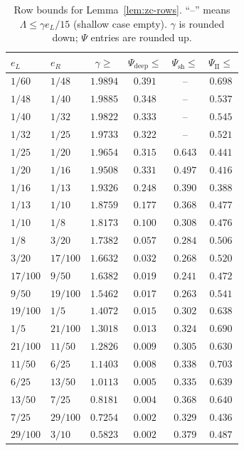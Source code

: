 \documentclass[11pt]{article}
\theoremstyle{remark}
\theoremstyle{plain}
\theoremstyle{plain}
\begin{document}
\begin{table}[h]
\centering\small
\caption{Row bounds for Lemma~\ref{lem:zc-rows}.  ``--'' means
$\Lambda\le\gamma e_L/15$ (shallow case empty).  $\gamma$ is rounded down;
$\Psi$ entries are rounded up.}\label{tab:rows}
\begin{tabular}{llcccc}
\toprule
$e_L$ & $e_R$ & $\gamma\ge$ & $\Psi_{\mathrm{deep}}\le$ &
$\Psi_{\mathrm{sh}}\le$ & $\Psi_{\mathrm{II}}\le$\\
\midrule
$1/60$ & $1/48$ & $1.9894$ & $0.391$ & -- & $0.698$\\
$1/48$ & $1/40$ & $1.9885$ & $0.348$ & -- & $0.537$\\
$1/40$ & $1/32$ & $1.9822$ & $0.333$ & -- & $0.545$\\
$1/32$ & $1/25$ & $1.9733$ & $0.322$ & -- & $0.521$\\
$1/25$ & $1/20$ & $1.9654$ & $0.315$ & $0.643$ & $0.441$\\
$1/20$ & $1/16$ & $1.9508$ & $0.331$ & $0.497$ & $0.416$\\
$1/16$ & $1/13$ & $1.9326$ & $0.248$ & $0.390$ & $0.388$\\
$1/13$ & $1/10$ & $1.8759$ & $0.177$ & $0.368$ & $0.477$\\
$1/10$ & $1/8$  & $1.8173$ & $0.100$ & $0.308$ & $0.476$\\
$1/8$  & $3/20$ & $1.7382$ & $0.057$ & $0.284$ & $0.506$\\
$3/20$ & $17/100$ & $1.6632$ & $0.032$ & $0.268$ & $0.520$\\
$17/100$ & $9/50$ & $1.6382$ & $0.019$ & $0.241$ & $0.472$\\
$9/50$ & $19/100$ & $1.5462$ & $0.017$ & $0.263$ & $0.541$\\
$19/100$ & $1/5$ & $1.4072$ & $0.015$ & $0.302$ & $0.638$\\
$1/5$ & $21/100$ & $1.3018$ & $0.013$ & $0.324$ & $0.690$\\
$21/100$ & $11/50$ & $1.2826$ & $0.009$ & $0.305$ & $0.630$\\
$11/50$ & $6/25$ & $1.1403$ & $0.008$ & $0.338$ & $0.703$\\
$6/25$ & $13/50$ & $1.0113$ & $0.005$ & $0.335$ & $0.639$\\
$13/50$ & $7/25$ & $0.8181$ & $0.004$ & $0.368$ & $0.640$\\
$7/25$ & $29/100$ & $0.7254$ & $0.002$ & $0.329$ & $0.436$\\
$29/100$ & $3/10$ & $0.5823$ & $0.002$ & $0.379$ & $0.487$\\
\bottomrule
\end{tabular}
\end{table}
\end{document}
